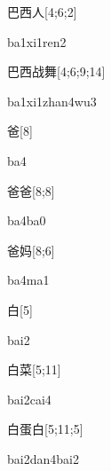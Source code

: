 \begin{verbete}[ba1xi1ren2]{巴西人}[4;6;2]
\begin{pronuncia}{ba1xi1ren2}
\end{pronuncia}
\end{verbete}

\begin{verbete}[ba1xi1zhan4wu3]{巴西战舞}[4;6;9;14]
\begin{pronuncia}[\\]{ba1xi1zhan4wu3}
\end{pronuncia}
\end{verbete}

\begin{verbete}[ba4]{爸}[8]
\begin{pronuncia}{ba4}
\end{pronuncia}
\end{verbete}

\begin{verbete}[ba4ba0]{爸爸}[8;8]
\begin{pronuncia}{ba4ba0}
\end{pronuncia}
\end{verbete}

\begin{verbete}[ba4ma1]{爸妈}[8;6]
\begin{pronuncia}{ba4ma1}
\end{pronuncia}
\end{verbete}

\begin{verbete}[bai2]{白}[5]
\begin{pronuncia}{bai2}
\end{pronuncia}
\end{verbete}

\begin{verbete}{白菜}[5;11]
\begin{pronuncia}{bai2cai4}
\end{pronuncia}
\end{verbete}

\begin{verbete}{白蛋白}[5;11;5]
\begin{pronuncia}{bai2dan4bai2}
\end{pronuncia}
\end{verbete}

